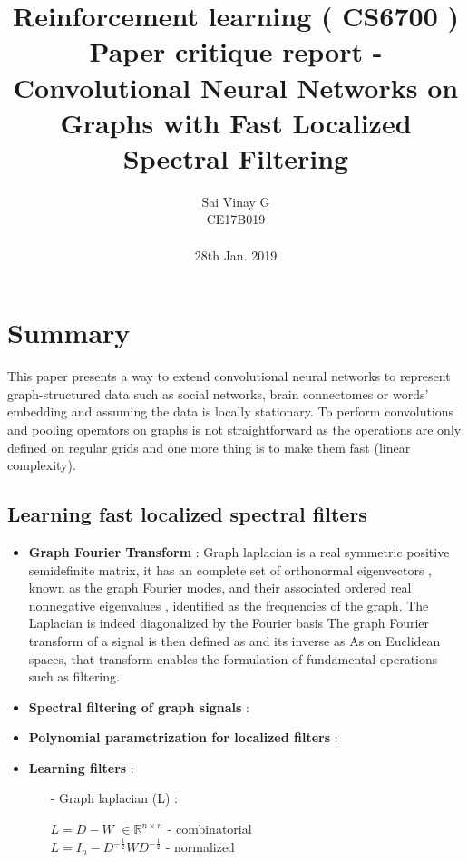\documentclass{article}
\title{ Reinforcement learning ( CS6700 ) \\
Paper critique report -  \\
Convolutional Neural Networks on Graphs
with Fast Localized Spectral Filtering}
\author{%
  Sai Vinay G \\
  CE17B019\\
  \\
  28th Jan. 2019 \\
}
\begin{document}

\maketitle


\section{Summary}

This paper presents a way to extend convolutional neural networks to represent 
graph-structured data such as social networks, brain connectomes or words’ embedding and 
assuming the data is locally stationary. To perform convolutions and pooling operators 
on graphs is not straightforward as the operations are only defined on regular grids
and one more thing is to make them fast (linear complexity). \\

\subsection{Learning fast localized spectral filters} 

\begin{itemize}
  \item {\bf Graph Fourier Transform} : Graph laplacian is a real symmetric positive semidefinite matrix, 
  it has an complete set of orthonormal eigenvectors , known as the graph Fourier modes, and
  their associated ordered real nonnegative eigenvalues  , identified as the frequencies of the
  graph. The Laplacian is indeed diagonalized by the Fourier basis
  The graph Fourier transform of a signal is then defined as and its inverse as As on Euclidean
  spaces, that transform enables the formulation of fundamental operations such as filtering.
  \item {\bf Spectral filtering of graph signals} :
  \item {\bf Polynomial parametrization for localized filters} :
  \item {\bf Learning filters} :
  
  \begin{itemize}
    \item[-] Graph laplacian (L) :
     
    $L = D - W $ $ \in \mathbb{R}^{n\times n} $   - combinatorial \\
    $L = {I_n} - D^{- \frac{1}{2}}WD^{- \frac{1}{2}} $  - normalized
  \end{itemize} 

\end{itemize}
\end{document}
